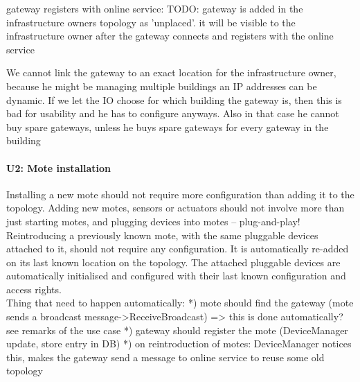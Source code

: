        gateway registers with online service:
            TODO: gateway is added in the infrastructure owners topology as 'unplaced'.
                  it will be visible to the infrastructure owner after the gateway connects and registers with the online service

            We cannot link the gateway to an exact location for the infrastructure owner, because he might be managing multiple buildings
            an IP addresses can be dynamic. If we let the IO choose for which building the gateway is, then this is bad for usability and
            he has to configure anyways. Also in that case he cannot buy spare gateways, unless he buys spare gateways for every gateway in the building


    \paragraph{U2: Mote installation}
        Installing a new mote should not require more configuration than adding it
        to the topology. Adding new motes, sensors or actuators should not involve
        more than just starting motes, and plugging devices into motes – plug-and-play!
        Reintroducing a previously known mote, with the same pluggable devices attached to it,
        should not require any configuration. It is automatically re-added on
        its last known location on the topology. The attached pluggable devices
        are automatically initialised and configured with their last known
        configuration and access rights. \\
        Thing that need to happen automatically:
        *) mote should find the gateway (mote sends a broadcast message->ReceiveBroadcast) => this is done automatically? see remarks of the use case
        *) gateway should register the mote (DeviceManager update, store entry in DB)
        *) on reintroduction of motes: DeviceManager notices this, makes the gateway send a message to online service to reuse some old topology

